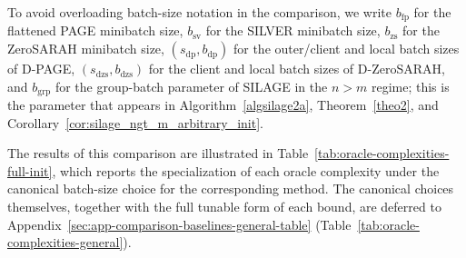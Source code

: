 \documentclass{article}
\theoremstyle{plain}
\newcommand{\algname}[1]{{\sf\scalefont{0.88}\color{mydarkgreen}#1}\xspace}
\def\algname#1{#1}%
\begin{document}
To avoid overloading batch-size notation in the comparison, we write $b_{\mathrm{fp}}$ for the flattened \algname{PAGE} minibatch size, $b_{\mathrm{sv}}$ for the \algname{SILVER} minibatch size, $b_{\mathrm{zs}}$ for the \algname{ZeroSARAH} minibatch size, $(s_{\mathrm{dp}},b_{\mathrm{dp}})$ for the outer/client and local batch sizes of \algname{D-PAGE}, $(s_{\mathrm{dzs}},b_{\mathrm{dzs}})$ for the client and local batch sizes of \algname{D-ZeroSARAH}, and $b_{\mathrm{grp}}$ for the group-batch parameter of \algname{SILAGE} in the $n>m$ regime; this is the parameter that appears in Algorithm~\ref{algsilage2a}, Theorem~\ref{theo2}, and Corollary~\ref{cor:silage_ngt_m_arbitrary_init}.

The results of this comparison are illustrated in Table~\ref{tab:oracle-complexities-full-init}, which reports the specialization of each oracle complexity under the canonical batch-size choice for the corresponding method. The canonical choices themselves, together with the full tunable form of each bound, are deferred to Appendix~\ref{sec:app-comparison-baselines-general-table} (Table~\ref{tab:oracle-complexities-general}).
\end{document}
